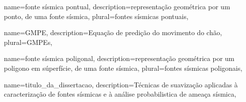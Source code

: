 {
	name={fonte sísmica pontual},
	description={representação geométrica por um ponto, de uma fonte sísmica},
	plural={fontes sísmicas pontuais},
}

{
	name={GMPE},
	description={Equação de predição do movimento do chão},
	plural={GMPEs},
}


{
	name={fonte sísmica poligonal},
	description={representação geométrica por um poligono em súperfície, 
				 de uma fonte sísmica},
	plural={fontes sísmicas poligonais},
}

{
	name={titulo_da_dissertacao},
	description={Técnicas de suavização aplicadas
					à caracterização de fontes sísmicas e 
					à análise probabilistica de ameaça sísmica},
}

